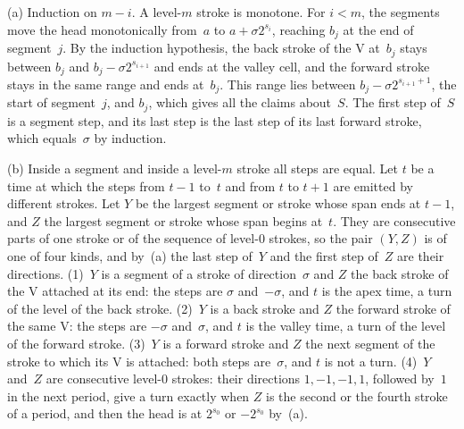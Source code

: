 \begin{informalproof}
(a) Induction on $m-i$. A level-$m$ stroke is monotone. For $i<m$, the segments move the head monotonically from~$a$
to $a+\sigma2^{s_i}$, reaching $b_j$ at the end of segment~$j$. By the induction hypothesis, the back stroke of the V
at~$b_j$ stays between $b_j$ and $b_j-\sigma2^{s_{i+1}}$ and ends at the valley cell, and the forward stroke stays in
the same range and ends at~$b_j$. This range lies between $b_j-\sigma2^{s_{i+1}+1}$, the start of segment~$j$, and
$b_j$, which gives all the claims about~$S$. The first step of~$S$ is a segment step, and its last step is the last
step of its last forward stroke, which equals~$\sigma$ by induction.

(b) Inside a segment and inside a level-$m$ stroke all steps are equal. Let $t$ be a time at which the steps from
$t-1$ to~$t$ and from $t$ to $t+1$ are emitted by different strokes. Let $Y$ be the largest segment or stroke whose
span ends at $t-1$, and $Z$ the largest segment or stroke whose span begins at~$t$. They are consecutive parts of one
stroke or of the sequence of level-$0$ strokes, so the pair $(Y,Z)$ is of one of four kinds, and by~(a) the last step
of~$Y$ and the first step of~$Z$ are their directions. (1)~$Y$ is a segment of a stroke of direction~$\sigma$ and $Z$
the back stroke of the V attached at its end: the steps are $\sigma$ and~$-\sigma$, and $t$ is the apex time, a turn
of the level of the back stroke. (2)~$Y$ is a back stroke and $Z$ the forward stroke of the same V: the steps are
$-\sigma$ and~$\sigma$, and $t$ is the valley time, a turn of the level of the forward stroke. (3)~$Y$ is a forward
stroke and $Z$ the next segment of the stroke to which its V is attached: both steps are~$\sigma$, and $t$ is not a
turn. (4)~$Y$ and~$Z$ are consecutive level-$0$ strokes: their directions $1,-1,-1,1$, followed by~$1$ in the next
period, give a turn exactly when $Z$ is the second or the fourth stroke of a period, and then the head is at
$2^{s_0}$ or $-2^{s_0}$ by~(a).


\end{informalproof}
